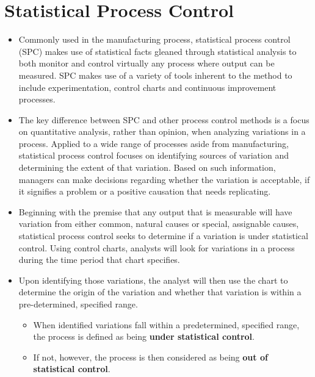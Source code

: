 \documentclass[12pt]{article}
\begin{document}
\tableofcontents

\newpage
\section{Statistical Process Control}

\begin{itemize}
\item Commonly used in the manufacturing process, statistical process control (SPC) makes use of statistical facts gleaned through statistical analysis to both monitor and control virtually any process where output can be measured. SPC makes use of a variety of tools inherent to the method to include experimentation, control charts and continuous improvement processes. 


\item The key difference between SPC and other process control methods is a focus on quantitative analysis, rather than opinion, when analyzing variations in a process. Applied to a wide range of processes aside from manufacturing, statistical process control focuses on identifying sources of variation and determining the extent of that variation. Based on such information, 
managers can make decisions regarding whether the variation is acceptable, if it signifies a problem or a positive causation that needs replicating.


\item Beginning with the premise that any output that is measurable will have variation from either common, natural causes or special, assignable causes, statistical process control seeks to determine if a variation is under statistical control. Using control charts, analysts will look for variations in a process during the time period that chart specifies. 

\item Upon identifying those variations, the analyst will then use the chart to determine the origin of the variation and whether that variation is within a pre-determined, specified range. 
\begin{itemize}
\item When identified variations fall within a predetermined, specified range, the process is defined as being \textbf{under statistical control}. 
\item If not, however, the process is then considered as being \textbf{out of statistical control}.
\end{itemize}


\end{itemize}
\end{document}
